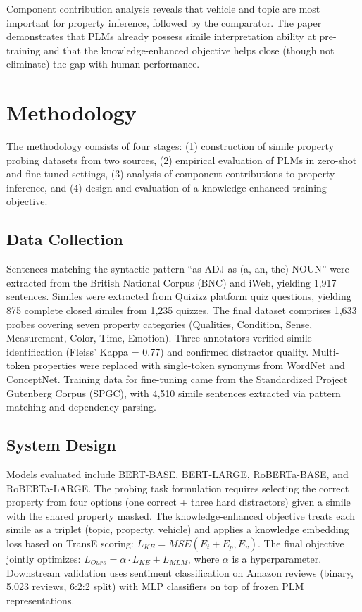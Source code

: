 \documentclass[12pt]{article}
\begin{document}
Component contribution analysis reveals that vehicle and topic are most important for property inference, followed by the comparator. The paper demonstrates that PLMs already possess simile interpretation ability at pre-training and that the knowledge-enhanced objective helps close (though not eliminate) the gap with human performance.

\section{Methodology}

The methodology consists of four stages: (1) construction of simile property probing datasets from two sources, (2) empirical evaluation of PLMs in zero-shot and fine-tuned settings, (3) analysis of component contributions to property inference, and (4) design and evaluation of a knowledge-enhanced training objective.

\subsection{Data Collection}

Sentences matching the syntactic pattern ``as ADJ as (a, an, the) NOUN'' were extracted from the British National Corpus (BNC) and iWeb, yielding 1,917 sentences. Similes were extracted from Quizizz platform quiz questions, yielding 875 complete closed similes from 1,235 quizzes. The final dataset comprises 1,633 probes covering seven property categories (Qualities, Condition, Sense, Measurement, Color, Time, Emotion). Three annotators verified simile identification (Fleiss' Kappa = 0.77) and confirmed distractor quality. Multi-token properties were replaced with single-token synonyms from WordNet and ConceptNet. Training data for fine-tuning came from the Standardized Project Gutenberg Corpus (SPGC), with 4,510 simile sentences extracted via pattern matching and dependency parsing.

\subsection{System Design}

Models evaluated include BERT-BASE, BERT-LARGE, RoBERTa-BASE, and RoBERTa-LARGE. The probing task formulation requires selecting the correct property from four options (one correct + three hard distractors) given a simile with the shared property masked. The knowledge-enhanced objective treats each simile as a triplet (topic, property, vehicle) and applies a knowledge embedding loss based on TransE scoring: $L_{KE} = MSE(E_t + E_p, E_v)$. The final objective jointly optimizes: $L_{Ours} = \alpha \cdot L_{KE} + L_{MLM}$, where $\alpha$ is a hyperparameter. Downstream validation uses sentiment classification on Amazon reviews (binary, 5,023 reviews, 6:2:2 split) with MLP classifiers on top of frozen PLM representations.
\end{document}
